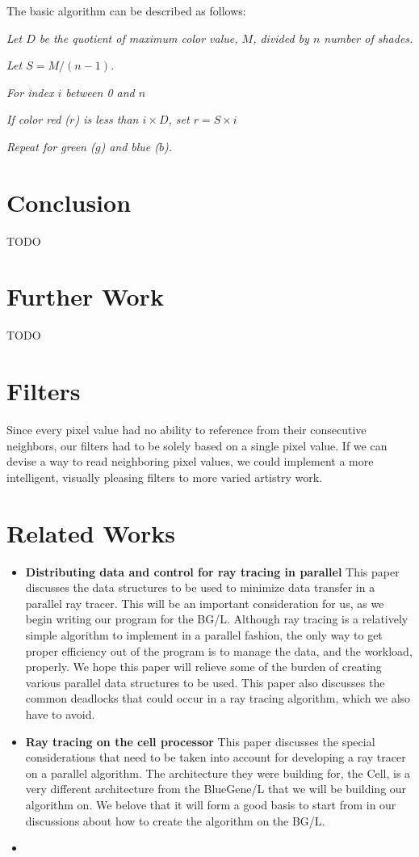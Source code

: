 \documentclass{acmsiggraph}
\begin{document}
The basic algorithm can be described as follows:

\textit{Let $D$ be the quotient of maximum color value, $M$, divided by $n$ number of shades.}

\textit{Let $S = M / (n - 1)$.}

\textit{For index $i$ between 0 and $n$}

\hspace{10 mm} \textit{If color red ($r$) is less than $i \times D$, set $r = S \times i$ }

\textit{Repeat for green ($g$) and blue ($b$).}


\section{Conclusion}
TODO


\section{Further Work}
TODO

\section*{Filters}
Since every pixel value had no ability to reference from their consecutive neighbors,
our filters had to be solely based on a single pixel value.  If we can devise a way to
read neighboring pixel values, we could implement a more intelligent, visually pleasing
filters to more varied artistry work.

\section*{Related Works}

\begin{itemize}
\item
\textbf{Distributing data and control for ray tracing in parallel} This paper
discusses the data structures to be used to minimize data transfer in a
parallel ray tracer. This will be an important consideration for us, as we
begin writing our program for the BG/L. Although ray tracing is a relatively
simple algorithm to implement in a parallel fashion, the only way to get proper
efficiency out of the program is to manage the data, and the workload,
properly. We hope this paper will relieve some of the burden of creating
various parallel data structures to be used. This paper also discusses the
common deadlocks that could occur in a ray tracing algorithm, which we also
have to avoid.\cite{badouel1994dda}
\item
\textbf{Ray tracing on the cell processor} This paper discusses the special
considerations that need to be taken into account for developing a ray tracer
on a parallel algorithm. The architecture they were building for, the Cell, is
a very different architecture from the BlueGene/L that we will be building our
algorithm on. We belove that it will form a good basis to start from in our
discussions about how to create the algorithm on the BG/L.\cite{benthin2006rtc}
\item
\end{itemize}



\end{document}
